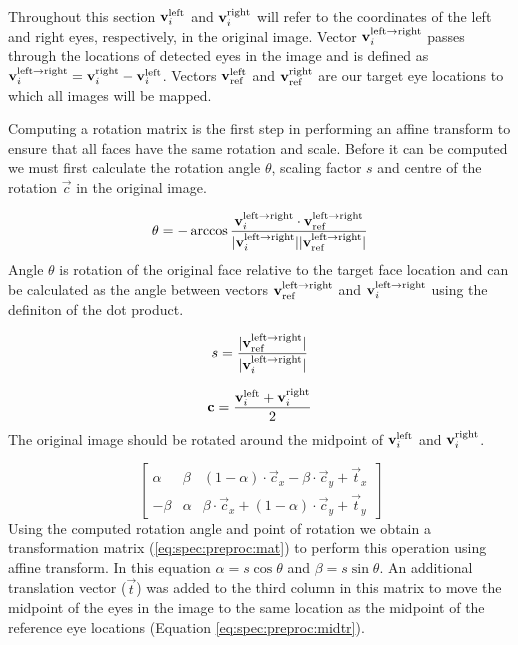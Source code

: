 Throughout this section $\mathbf{v}_i^{\text{left}}$ and $\mathbf{v}_i^{\text{right}}$ will refer to the
coordinates of the left and right eyes, respectively, in the original image.
Vector $\mathbf{v}_i^{\text{left} \rightarrow \text{right}}$ passes through the locations of detected eyes in the image
and is defined as $\mathbf{v}_i^{\text{left} \rightarrow \text{right}} = \mathbf{v}_i^{\text{right}} - \mathbf{v}_i^{\text{left}}$. Vectors
$\mathbf{v}_{\text{ref}}^{\text{left}}$ and $\mathbf{v}_{\text{ref}}^{\text{right}}$ are our target eye locations to which all images
will be mapped.

Computing a rotation matrix is the first step in performing an affine transform
to ensure that all faces have the same rotation and scale. Before it can be 
computed we must first calculate the rotation angle $\theta$, scaling factor
$s$ and centre of the rotation $\vec{c}$ in the original image.

\begin{equation}
    \label{eq:spec:preproc:angle}
    \theta = -\arccos{\frac{\mathbf{v}_i^{\text{left} \rightarrow \text{right}}\cdot \mathbf{v}_{\text{ref}}^{\text{left} \rightarrow \text{right}}}{|\mathbf{v}_i^{\text{left} \rightarrow \text{right}}| |\mathbf{v}_{\text{ref}}^{\text{left} \rightarrow \text{right}}|}}
\end{equation}
Angle $\theta$ is rotation of the original face relative to the target face
location and can be calculated as the angle between vectors $\mathbf{v}_{\text{ref}}^{\text{left} \rightarrow \text{right}}$ and
$\mathbf{v}_i^{\text{left} \rightarrow \text{right}}$ using the definiton of the dot product.

\begin{equation}
    \label{eq:spec:preproc:scales}
    s = \frac{|\mathbf{v}_{\text{ref}}^{\text{left} \rightarrow \text{right}}|}{|\mathbf{v}_i^{\text{left} \rightarrow \text{right}}|}
\end{equation}

\begin{equation}
    \label{eq:spec:preproc:centre}
    \mathbf{c} = \frac{\mathbf{v}_i^{\text{left}} + \mathbf{v}_i^{\text{right}}}{2}
\end{equation}
The original image should be rotated around the midpoint of $\mathbf{v}_i^{\text{left}}$ and $\mathbf{v}_i^{\text{right}}$.

\begin{equation}
    \label{eq:spec:preproc:mat}
    \begin{bmatrix}
    \alpha & \beta  & (1-\alpha)\cdot \vec{c}_x - \beta \cdot \vec{c}_y + \vec{t}_x \\
    -\beta & \alpha & \beta \cdot \vec{c}_x + (1-\alpha)\cdot \vec{c}_y + \vec{t}_y
    \end{bmatrix}
\end{equation}
Using the computed rotation angle and point of rotation we obtain a 
transformation matrix (\ref{eq:spec:preproc:mat}) to perform this operation
using affine transform. In this equation $\alpha = s\cos\theta$ and $\beta =
s\sin\theta$. An additional translation vector ($\vec{t}$) was added to the third
column in this matrix to move the midpoint of the eyes in the image to the same
location as the midpoint of the reference eye locations (Equation
\ref{eq:spec:preproc:midtr}). 

